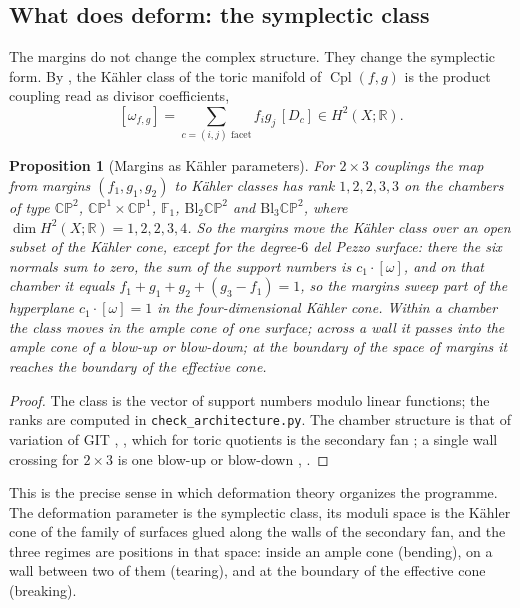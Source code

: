 \documentclass[11pt]{article}
\newtheorem{proposition}[theorem]{Proposition}
\theoremstyle{definition}
\theoremstyle{remark}
\newcommand{\R}{\mathbb{R}}
\newcommand{\Cpl}{\operatorname{Cpl}}
\newcommand{\CP}{\mathbb{CP}}
\begin{document}
\subsection{What does deform: the symplectic class}

The margins do not change the complex structure. They change the symplectic form. By \cite[Prop.~2.2]{Family}, the Kähler class of the
toric manifold of $\Cpl(f,g)$ is the product coupling read as divisor coefficients,
\[
[\omega_{f,g}]=\sum_{c=(i,j)\text{ facet}}f_ig_j\,[D_c]\in H^2(X;\R).
\]

\begin{proposition}[Margins as Kähler parameters]\label{prop:kahlermoduli}
For $2\times3$ couplings the map from margins $(f_1,g_1,g_2)$ to Kähler classes has rank $1,2,2,3,3$ on the chambers of type $\CP^2$,
$\CP^1\times\CP^1$, $\mathbb F_1$, $\mathrm{Bl}_2\CP^2$ and $\mathrm{Bl}_3\CP^2$, where $\dim H^2(X;\R)=1,2,2,3,4$. So the margins move the Kähler
class over an open subset of the Kähler cone, except for the degree-$6$ del Pezzo surface: there the six normals sum to zero, the sum of the
support numbers is $c_1\cdot[\omega]$, and on that chamber it equals $f_1+g_1+g_2+(g_3-f_1)=1$, so the margins sweep part of the hyperplane
$c_1\cdot[\omega]=1$ in the four-dimensional Kähler cone. Within a chamber the class moves in the ample cone of one surface; across a wall it
passes into the ample cone of a blow-up or blow-down; at the boundary of the space of margins it reaches the boundary of the effective cone.
\end{proposition}
\begin{proof}
The class is the vector of support numbers modulo linear functions; the ranks are computed in \texttt{check\_architecture.py}. The chamber
structure is that of variation of GIT \cite[Prop.~10.5]{Conditionals}, \cite{Thaddeus1996,DolgachevHu1998}, which for toric quotients is the
secondary fan \cite{GKZ1994,OdaPark1991}; a single wall crossing for $2\times3$ is one blow-up or blow-down \cite[Prop.~3.3]{Family}, \cite[Prop.~8.1]{Bridges}.
\end{proof}

This is the precise sense in which deformation theory organizes the programme. The deformation parameter is the symplectic class, its moduli
space is the Kähler cone of the family of surfaces glued along the walls of the secondary fan, and the three regimes are positions in that
space: inside an ample cone (bending), on a wall between two of them (tearing), and at the boundary of the effective cone (breaking).
\end{document}
